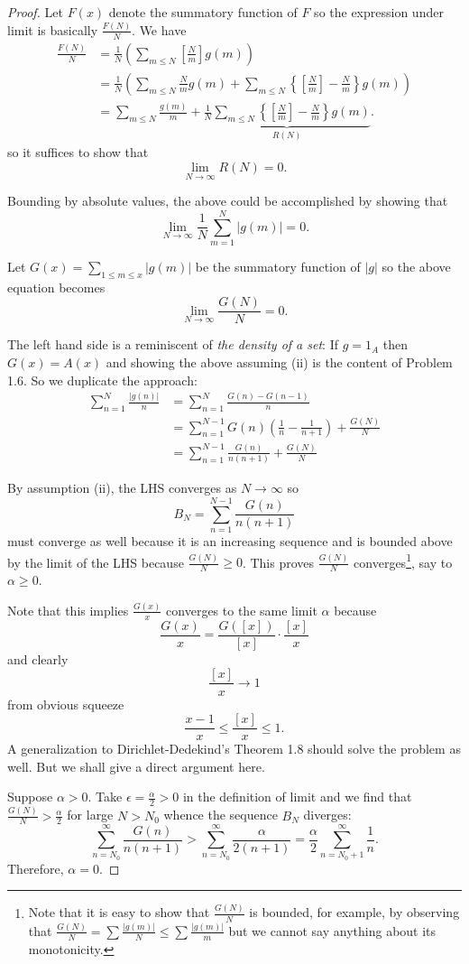 \documentclass{article}
\newcommand{\IntPart}[1]{\left[ #1 \right]}
\begin{document}
\begin{proof}
Let $F(x)$ denote the summatory function of $F$ so the expression under limit is basically $\frac{F(N)}{N}$. We have
\begin{align*}
\frac{F(N)}{N} &= \frac1N \left(\sum_{m \leq N} \IntPart{\frac{N}{m}} g(m) \right)\\
&= \frac1N \left(\sum_{m \leq N} \frac{N}{m} g(m) + \sum_{m \leq N} \left\{ \IntPart{\frac{N}{m}} - \frac{N}{m} \right\} g(m) \right)\\
&= \sum_{m \leq N} \frac{g(m)}{m} + \underbrace{\frac1N \sum_{m \leq N} \left\{ \IntPart{\frac{N}{m}} - \frac{N}{m} \right\} g(m)}_{R(N)}.
\end{align*}
so it suffices to show that
$$\lim_{N \rightarrow \infty} R(N) = 0.$$

Bounding by absolute values, the above could be accomplished by showing that
$$\lim_{N \rightarrow \infty} \frac1N \sum_{m=1}^{N} |g(m)| = 0.$$

Let $G(x) = \sum_{1 \leq m \leq x} |g(m)|$ be the summatory function of $|g|$ so the above equation becomes 
$$\lim_{N \rightarrow \infty} \frac{G(N)}{N} = 0.$$

The left hand side is a reminiscent of \emph{the density of a set}: If $g = 1_A$ then $G(x) = A(x)$ and showing the above assuming (ii) is the content of Problem 1.6. So we duplicate the approach:
\begin{align*}
\sum_{n = 1}^N \frac{|g(n)|}{n} &= \sum_{n = 1}^{N} \frac{G(n) - G(n-1)}{n}\\
&= \sum_{n = 1}^{N - 1} G(n) \left(\frac{1}{n} - \frac{1}{n+1}\right) + \frac{G(N)}{N}\\
&= \sum_{n = 1}^{N - 1} \frac{G(n)}{n(n+1)} + \frac{G(N)}{N}
\end{align*}

By assumption (ii), the LHS converges as $N \rightarrow \infty$ so
$$B_N = \sum_{n = 1}^{N - 1} \frac{G(n)}{n(n+1)}$$
must converge as well because it is an increasing sequence and is bounded above by the limit of the LHS because $\frac{G(N)}{N} \geq 0$. This proves $\frac{G(N)}{N}$ converges\footnote{Note that it is easy to show that $\frac{G(N)}{N}$ is bounded, for example, by observing that $\frac{G(N)}{N} = \sum \frac{|g(m)|}{N} \leq \sum \frac{|g(m)|}{m}$ but we cannot say anything about its monotonicity.}, say to $\alpha \geq 0$.

Note that this implies $\frac{G(x)}{x}$ converges to the same limit $\alpha$ because
$$\frac{G(x)}{x} = \frac{G([x])}{[x]} \cdot \frac{[x]}{x}$$
and clearly
$$\frac{[x]}{x} \rightarrow 1$$
from obvious squeeze
$$\frac{x - 1}{x} \leq \frac{[x]}{x} \leq 1.$$
A generalization to Dirichlet-Dedekind's Theorem 1.8 should solve the problem as well. But we shall give a direct argument here.

Suppose $\alpha > 0$. Take $\epsilon = \frac{\alpha}{2} > 0$ in the definition of limit and we find that $\frac{G(N)}{N} >  \frac{\alpha}{2}$ for large $N > N_0$ whence the sequence $B_N$ diverges:
$$\sum_{n = N_0}^{\infty} \frac{G(n)}{n(n+1)} > \sum_{n = N_0}^{\infty} \frac{\alpha}{2(n+1)} = \frac{\alpha}{2} \sum_{n = N_0 + 1}^{\infty} \frac{1}{n}.$$
Therefore, $\alpha = 0$.
\end{proof}
\end{document}
